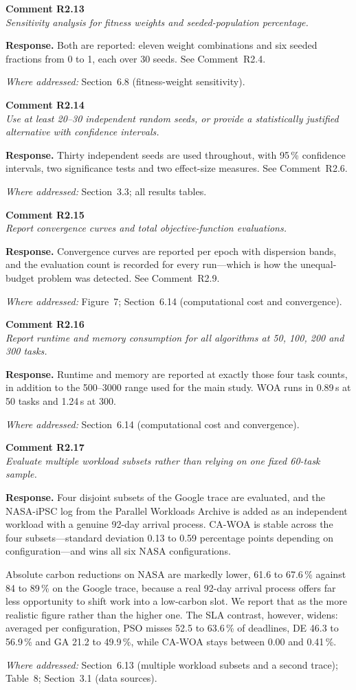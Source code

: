 \documentclass[11pt,a4paper]{article}
\newcommand{\rsp}[1]{\vspace{2pt}\noindent\textbf{Response.} #1\par\vspace{6pt}}
\newcommand{\rwhere}[1]{\noindent\textit{Where addressed:} #1\par\vspace{10pt}}
\newenvironment{revcomment}[1]
  {\begin{tcolorbox}[colback=gray!6,colframe=gray!45,boxrule=0.4pt,
     left=6pt,right=6pt,top=4pt,bottom=4pt]\textbf{#1}\\[2pt]\itshape\color{cmt}}
  {\end{tcolorbox}\vspace{4pt}}
\begin{document}
\begin{revcomment}{Comment R2.13}
Sensitivity analysis for fitness weights and seeded-population percentage.
\end{revcomment}
\rsp{Both are reported: eleven weight combinations and six seeded fractions from 0 to
1, each over 30 seeds. See Comment~R2.4.}
\rwhere{Section~6.8 (fitness-weight sensitivity).}

\begin{revcomment}{Comment R2.14}
Use at least 20--30 independent random seeds, or provide a statistically justified
alternative with confidence intervals.
\end{revcomment}
\rsp{Thirty independent seeds are used throughout, with 95\,\% confidence intervals,
two significance tests and two effect-size measures. See Comment~R2.6.}
\rwhere{Section~3.3; all results tables.}

\begin{revcomment}{Comment R2.15}
Report convergence curves and total objective-function evaluations.
\end{revcomment}
\rsp{Convergence curves are reported per epoch with dispersion bands, and the
evaluation count is recorded for every run---which is how the unequal-budget
problem was detected. See Comment~R2.9.}
\rwhere{Figure~7; Section~6.14 (computational cost and convergence).}

\begin{revcomment}{Comment R2.16}
Report runtime and memory consumption for all algorithms at 50, 100, 200 and 300
tasks.
\end{revcomment}
\rsp{Runtime and memory are reported at exactly those four task counts, in addition
to the 500--3000 range used for the main study. WOA runs in 0.89\,s at 50 tasks and
1.24\,s at 300.}
\rwhere{Section~6.14 (computational cost and convergence).}

\begin{revcomment}{Comment R2.17}
Evaluate multiple workload subsets rather than relying on one fixed 60-task sample.
\end{revcomment}
\rsp{Four disjoint subsets of the Google trace are evaluated, and the NASA-iPSC log
from the Parallel Workloads Archive is added as an independent workload with a
genuine 92-day arrival process. CA-WOA is stable across the four subsets---standard
deviation 0.13 to 0.59 percentage points depending on configuration---and wins all six
NASA configurations.

Absolute carbon reductions on NASA are markedly lower, 61.6 to 67.6\,\% against 84 to
89\,\% on the Google trace, because a real 92-day arrival process offers far less
opportunity to shift work into a low-carbon slot. We report that as the more realistic
figure rather than the higher one. The SLA contrast, however, widens: averaged per
configuration, PSO misses 52.5 to 63.6\,\% of deadlines, DE 46.3 to 56.9\,\% and GA
21.2 to 49.9\,\%, while CA-WOA stays between 0.00 and 0.41\,\%.}
\rwhere{Section~6.13 (multiple workload subsets and a second trace); Table~8;
Section~3.1 (data sources).}
\end{document}
